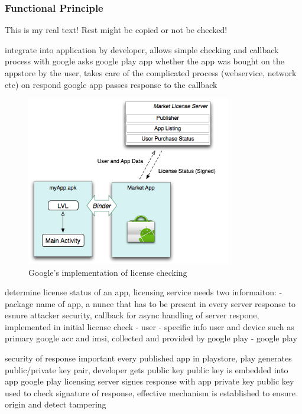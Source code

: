 \subsubsection{Functional Principle} \label{subsection:license-google-functional}
This is my real text! Rest might be copied or not be checked!

%
integrate into application by developer, allows simple checking and callback process with google
asks google play app whether the app was bought on the appstore by the user, takes care of the complicated process (webservice, network etc)
on respond google app passes response to the callback
\begin{figure}[h]
    \centering
    \includegraphics[width=0.8\textwidth]{data/lvl.png}
    \caption{Google's implementation of license checking \cite{developersLicensingOverview}}
    \label{fig:lvl}
\end{figure}

determine license status of an app, licensing service needs two informaiton:
- package name of app, a nunce that has to be present in every server response to esnure attacker security, callback for async handling of server respone, implemented in initial license check - user
- specific info user and device such as primary google acc and imsi, collected and provided by google play - google play

security of response important
every published app in playstore, play generates public/private key pair, developer gets public key
public key is embedded into app
google play licensing server signes response with app private key
public key used to check signature of response, effective mechanism is established to ensure origin and detect tampering
\cite{munteanLicense}
%

